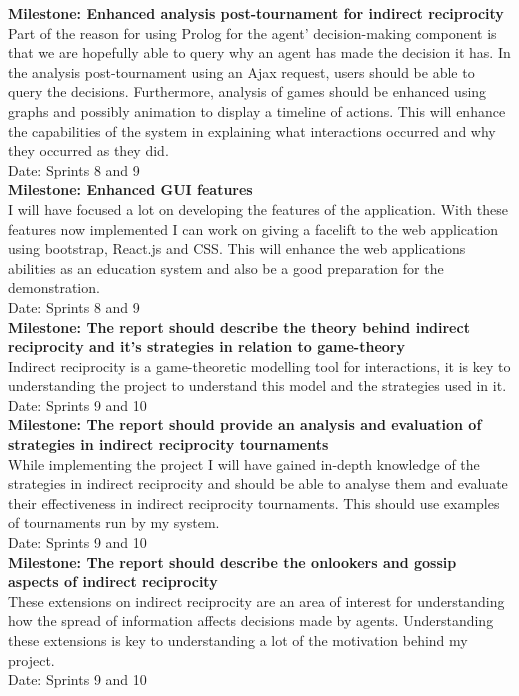 \documentclass{article}
\begin{document}
\noindent\textbf{Milestone: Enhanced analysis post-tournament for indirect reciprocity}\\
Part of the reason for using Prolog for the agent' decision-making component is that we are hopefully able to query why an agent has made the decision it has. In the analysis post-tournament using an Ajax request, users should be able to query the decisions. Furthermore, analysis of games should be enhanced using graphs and possibly animation to display a timeline of actions. This will enhance the capabilities of the system in explaining what interactions occurred and why they occurred as they did.\\
Date: Sprints 8 and 9\\

\noindent\textbf{Milestone: Enhanced GUI features}\\
I will have focused a lot on developing the features of the application. With these features now implemented I can work on giving a facelift to the web application using bootstrap, React.js and CSS. This will enhance the web applications abilities as an education system and also be a good preparation for the demonstration.\\
Date: Sprints 8 and 9\\

\noindent\textbf{Milestone: The report should describe the theory behind indirect reciprocity and it's strategies in relation to game-theory}\\
Indirect reciprocity is a game-theoretic modelling tool for interactions, it is key to understanding the project to understand this model and the strategies used in it.\\
Date: Sprints 9 and 10\\

\noindent\textbf{Milestone: The report should provide an analysis and evaluation of strategies in indirect reciprocity tournaments}\\
While implementing the project I will have gained in-depth knowledge of the strategies in indirect reciprocity and should be able to analyse them and evaluate their effectiveness in indirect reciprocity tournaments. This should use examples of tournaments run by my system.\\
Date: Sprints 9 and 10\\

\noindent\textbf{Milestone: The report should describe the onlookers and gossip aspects of indirect reciprocity}\\
These extensions on indirect reciprocity are an area of interest for understanding how the spread of information affects decisions made by agents. Understanding these extensions is key to understanding a lot of the motivation behind my project.\\
Date: Sprints 9 and 10\\
\end{document}
